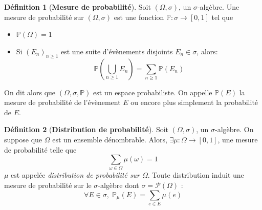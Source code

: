 \documentclass[12pt,a4paper]{report}
\theoremstyle{definition}%
\newtheorem{definition}{Définition}[chapter]
\theoremstyle{remark}
\let\labelitemi\labelitemii
\begin{document}
\begin{definition}[\textbf{Mesure de probabilité}]\label{proba_measure} Soit $(\Omega, \sigma)$, un $\sigma$-algèbre.
	Une mesure de probabilité sur $(\Omega, \sigma)$ est une fonction $\mathbb{P} : \sigma \rightarrow [0, 1]$ tel que
	\begin{itemize}
		\renewcommand{\labelitemi}{\tiny$\bullet$}
		\item $\mathbb{P}(\Omega) = 1$
		\item Si $(E_n)_{n \geq 1}$ est une suite d'évènements disjoints $E_n \in \sigma$, alors:
		\[\mathbb{P}(\bigcup_{n \geq 1} E_n) = \sum_{n \geq 1} \mathbb{P}(E_n)\]
	\end{itemize}
	On dit alors que $(\Omega, \sigma, \mathbb{P})$ est un espace probabiliste.
	On appelle $\mathbb{P}(E)$ la mesure de probabilité de l'évènement $E$ ou encore plus simplement la probabilité de $E$.
\end{definition}

\begin{definition}[\textbf{Distribution de probabilité}]
	Soit $(\Omega, \sigma)$, un $\sigma$-algèbre. 
	On suppose que $\Omega$ est un ensemble dénombrable. Alors, $\exists \mu: \Omega \rightarrow [0,1]$, une mesure de probabilité telle que 
	\[\sum_{\omega \in \Omega} \mu(\omega) =1 \]
	$\mu$ est appelée \textit{distribution de probabilité sur $\Omega$}. Toute distribution induit une mesure de probabilité sur le $\sigma$-algèbre dont $\sigma = \mathcal{P}(\Omega)$ :
	\[ \forall E \in \sigma,\; \mathbb{P}_{\mu}(E) = \sum_{e \in E} \mu(e)\]
\end{definition}
\end{document}
